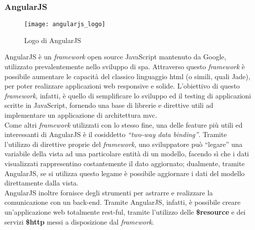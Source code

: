 \subsubsection{AngularJS}
\begin{figure}[H] 
    \centering 
    \texttt{[image: angularjs\_logo]} 
    \caption{Logo di AngularJS}
\end{figure}
AngularJS è un \emph{framework} open source JavaScript mantenuto da Google, utilizzato prevalentemente nello sviluppo di \gls{spa}\glsfirstoccur. Attraverso questo \emph{framework} è possibile aumentare le capacità del classico linguaggio \gls{html} (o simili, quali Jade), per poter realizzare applicazioni web responsive e solide. 
L’obiettivo di questo \emph{framework}, infatti, è quello di semplificare lo sviluppo ed il testing di applicazioni scritte in JavaScript, fornendo una base di librerie e direttive utili ad implementare un applicazione di architettura \gls{mvc}.\\
Come altri \emph{framework} utilizzati con lo stesso fine, una delle feature più utili ed interessanti di AngularJS è il cosiddetto \emph{“two-way data binding”}. Tramite l’utilizzo di direttive proprie del \emph{framework}, uno sviluppatore può “legare” una variabile della vista ad una particolare entità di un modello, facendo sì che i dati visualizzati rappresentino costantemente il dato aggiornato; dualmente, tramite AngularJS, se si utilizza questo legame è possibile aggiornare i dati del modello direttamente dalla vista.\\
AngularJS inoltre fornisce degli strumenti per astrarre e realizzare la comunicazione con un \gls{back-end}. Tramite AngularJS, infatti, è possibile creare un'applicazione web totalmente \gls{rest}-ful, tramite l’utilizzo delle \textbf{\$resource} e dei servizi \textbf{\$http} messi a disposizione dal \emph{framework}.

